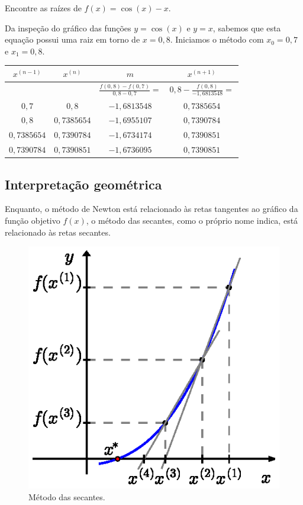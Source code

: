 \begin{ex} Encontre as raízes de $f(x)=\cos(x)-x$.
\end{ex}
\begin{sol}
Da inspeção do gráfico das funções $y=\cos(x)$ e $y=x$, sabemos que esta equação possui uma raiz em torno de $x=0,8$. Iniciamos o método com $x_0=0,7$ e $x_1=0,8$.
\begin{center}
\begin{tabular}{|c|c|c|c|}\hline
$x^{(n-1)}$ & $x^{(n)}$ & $m$ & $x^{(n+1)}$\\\hline
 & & $\frac{f(0,8)-f(0,7)}{0,8-0,7} =$ & $0,8- \frac{f(0,8)}{-1,6813548}=$\\
$0,7$ & $0,8$ & $-1,6813548$ & $0,7385654$\\\hline
$0,8$ & $0,7385654$ & $-1,6955107$ & $0,7390784$ \\\hline
 $0,7385654$ & $0,7390784$ &  $-1,6734174$ & $0,7390851$ \\\hline
$0,7390784$ & $0,7390851$ & $-1,6736095$ & $0,7390851$ \\\hline
\end{tabular}  
\end{center}  
\end{sol}

\subsection{Interpretação geométrica}

Enquanto, o método de Newton está relacionado às retas tangentes ao gráfico da função objetivo $f(x)$, o método das secantes, como o próprio nome indica, está relacionado às retas secantes.

\begin{figure}[h]
  \centering
  \includegraphics{./cap_equacao1d/pics/metodo_das_secantes/metodo_das_secantes.eps}
  \caption{Método das secantes.}
  \label{fig:metodo_das_secantes}
\end{figure}

